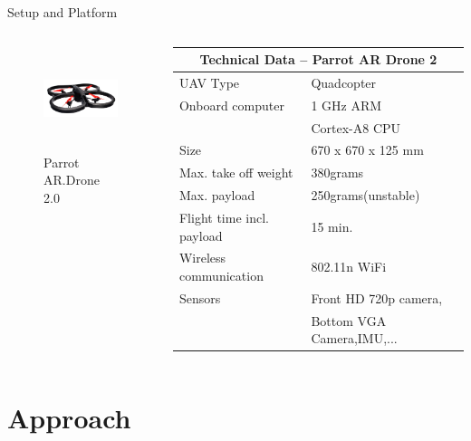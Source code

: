 \documentclass[8pt]{beamer}
\begin{document}
\begin{frame}{Setup and Platform}
\begin{columns}[c]
        \begin{figure}
             \includegraphics[width=3cm, height=3cm]{images/AR_Drone_2.jpg}%
	     \caption{Parrot AR.Drone 2.0}
	     \label{Figure: Parrot_AR_Drone_2}%
        \end{figure}     
        \footnotesize{
	  \begin{table}[h]
	  \centering
	  \begin{tabular}{@{}ll@{}}
	  \hline
	  \multicolumn{2}{c}{Technical Data – Parrot AR Drone 2} \\
	  \hline
	  UAV Type & Quadcopter  \\
	  Onboard computer & 1 GHz ARM \\
	  ~ & Cortex-A8 CPU\\
	  Size & 670 x 670 x 125 mm  \\
	  Max. take off weight & 380grams\\ 
	  Max. payload & 250grams(unstable)\\
	  Flight time incl. payload & 15 min.\\
	  Wireless communication & 802.11n WiFi\\
	  Sensors & Front HD 720p camera,\\
	  ~ & Bottom VGA Camera,IMU,...\\
	  \end{tabular}
	  \end{table}
	 }
	 
\end{columns}

\end{frame}


\section{Approach}
\end{document}

